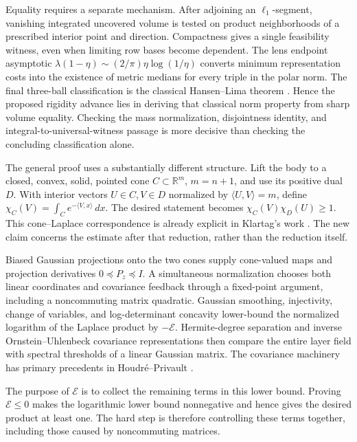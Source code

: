 Equality requires a separate mechanism. After adjoining an
\(\ell_1\)-segment, vanishing integrated uncovered volume is tested on
product neighborhoods of a prescribed interior point and direction.
Compactness gives a single feasibility witness, even when limiting
row bases become dependent. The lens endpoint asymptotic
\(\lambda(1-\eta)\sim(2/\pi)\eta\log(1/\eta)\) converts minimum
representation costs into the existence of metric medians for every
triple in the polar norm. The final three-ball classification is the
classical Hansen--Lima theorem
\cite[Corollary~7.4]{GOHansenLima1981}. Hence the proposed rigidity
advance lies in deriving that classical norm property from sharp
volume equality. Checking the mass normalization, disjointness identity,
and integral-to-universal-witness passage is more decisive than checking
the concluding classification alone.

The general proof uses a substantially different structure. Lift the
body to a closed, convex, solid, pointed cone \(C\subset\mathbb R^m\),
\(m=n+1\), and use its positive dual \(D\). With interior vectors
\(U\in C,V\in D\) normalized by \(\langle U,V\rangle=m\), define
\(\chi_C(V)=\int_Ce^{-\langle V,x\rangle}\,dx\).
The desired statement becomes
\(\chi_C(V)\chi_D(U)\ge1\). This cone--Laplace correspondence is
already explicit in Klartag's work
\cite[Lemma~2.1 and Corollary~4.1]{GOKlartag2018}.
The new claim concerns the estimate after that reduction, rather than
the reduction itself.

Biased Gaussian projections onto the two cones supply cone-valued
maps and projection derivatives \(0\preceq P_z\preceq I\).
A simultaneous normalization chooses both linear coordinates and
covariance feedback through a fixed-point argument, including a
noncommuting matrix quadratic. Gaussian smoothing, injectivity, change
of variables, and log-determinant concavity lower-bound the normalized
logarithm of the Laplace product by \(-\mathcal E\). Hermite-degree
separation and inverse Ornstein--Uhlenbeck covariance representations
then compare the entire layer field with spectral thresholds of a
linear Gaussian matrix. The covariance machinery has primary precedents
in Houdr\'e--Privault
\cite[Proposition~2.1]{GOHoudrePrivault2002}.

The purpose of \(\mathcal E\) is to collect the remaining terms in
this lower bound. Proving \(\mathcal E\le0\) makes the logarithmic
lower bound nonnegative and hence gives the desired product at least
one. The hard step is therefore controlling these terms together,
including those caused by noncommuting matrices.

